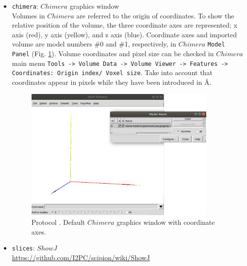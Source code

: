 \documentclass[12pt, draft]{article} %
\newcommand{\ffigure}[1]{{Fig. {\ref{#1}}}\xspace}
\newcommand{\scommand}[1]{{{\keys{#1}}}\xspace}
\newcommand{\ttt}[1]{\texttt{#1}}
\begin{document}
\begin{appendices}
\begin{itemize}
   \begin{itemize}
   \item \ttt{chimera}: $Chimera$ graphics window\\
   
   Volumes in $Chimera$ are referred to the origin of coordinates. To show the relative position of the volume, the three coordinate axes are represented; x axis (red), y axis (yellow), and z axis (blue). Coordinate axes and imported volume are model numbers \#0 and \#1, respectively, in $Chimera$ \ttt{Model Panel} (\ffigure{fig:app_protocol_volume_3}). Volume coordinates and pixel size can be checked in $Chimera$ main menu \ttt{Tools -> Volume Data -> Volume Viewer -> Features -> Coordinates: Origin index/ Voxel size}. Take into account that coordinates appear in pixels while they have been introduced in \AA.
   
   \begin{figure}[H]
   \centering 
    \captionsetup{width=.7\linewidth} 
    \includegraphics[width=0.90\textwidth]{Images_appendix/Fig102.png}
    \caption{Protocol \scommand{import volumes}. Default $Chimera$ graphics window with coordinate axes.}
    \label{fig:app_protocol_volume_3}
    \end{figure}
   
  \item \ttt{slices}: $ShowJ$\\
   
\url{https://github.com/I2PC/scipion/wiki/ShowJ}



\end{itemize}
\end{itemize}
\end{appendices}
\end{document}
